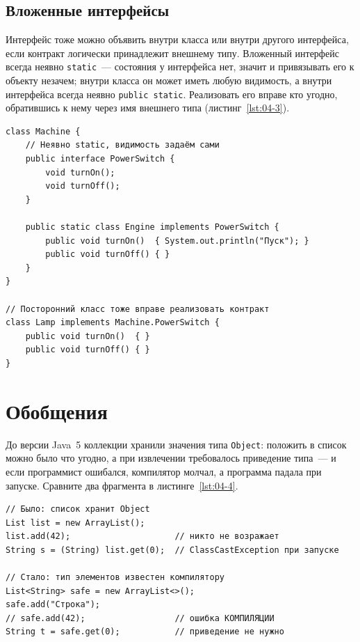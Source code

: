 \subsection{Вложенные интерфейсы}

Интерфейс тоже можно объявить внутри класса или внутри другого интерфейса, если
контракт логически принадлежит внешнему типу. Вложенный интерфейс всегда неявно
\texttt{static}~--- состояния у интерфейса нет, значит и привязывать его к
объекту незачем; внутри класса он может иметь любую видимость, а внутри
интерфейса всегда неявно \texttt{public static}. Реализовать его вправе кто
угодно, обратившись к нему через имя внешнего типа (листинг~\ref{lst:04-3}).

\begin{listing}[H]
\begin{verbatim}
class Machine {
    // Неявно static, видимость задаём сами
    public interface PowerSwitch {
        void turnOn();
        void turnOff();
    }

    public static class Engine implements PowerSwitch {
        public void turnOn()  { System.out.println("Пуск"); }
        public void turnOff() { }
    }
}

// Посторонний класс тоже вправе реализовать контракт
class Lamp implements Machine.PowerSwitch {
    public void turnOn()  { }
    public void turnOff() { }
}
\end{verbatim}
\caption{Интерфейс, объявленный внутри класса}
\label{lst:04-3}
\end{listing}

\section{Обобщения}

До версии Java~5 коллекции хранили значения типа \texttt{Object}: положить в
список можно было что угодно, а при извлечении требовалось приведение типа~---
и если программист ошибался, компилятор молчал, а программа падала при запуске.
Сравните два фрагмента в листинге~\ref{lst:04-4}.

\begin{listing}[H]
\begin{verbatim}
// Было: список хранит Object
List list = new ArrayList();
list.add(42);                     // никто не возражает
String s = (String) list.get(0);  // ClassCastException при запуске

// Стало: тип элементов известен компилятору
List<String> safe = new ArrayList<>();
safe.add("Строка");
// safe.add(42);                  // ошибка КОМПИЛЯЦИИ
String t = safe.get(0);           // приведение не нужно
\end{verbatim}
\caption{Коллекция без обобщений и с обобщениями}
\label{lst:04-4}
\end{listing}

